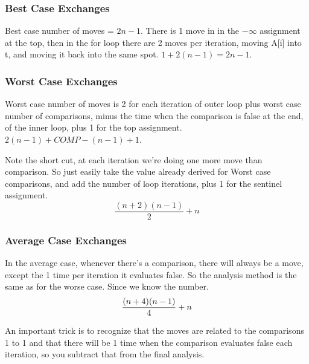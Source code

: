 \documentclass[english, 10pt]{article}
\begin{document}
\subsubsection{Best Case Exchanges}
Best case number of moves = $2n-1$. There is 1 move in in the $-\infty$ assignment at the top, then in the for loop there are 2 moves per iteration, moving A[i] into t,
and moving it back into the same spot. $1 + 2(n-1) = 2n -1$. \\

\subsubsection{Worst Case Exchanges}
Worst case number of moves is 2 for each iteration of outer loop plus worst case number of comparisons, minus the time when the comparison is false at the end, of the inner loop, plus 1 for the top assignment. $2(n-1) + COMP - (n-1) +1 $.

Note the short cut, at each iteration we're doing one more move than comparison. So just easily take the value already derived for Worst case comparisons,
and add the number of loop iterations, plus 1 for the sentinel assignment.
$$\frac{(n+2)(n-1)}{2} +n $$

\subsubsection{Average Case Exchanges}
In the average case, whenever there's a comparison, there will always be a move, except the 1 time per iteration it evaluates false.
So the analysis method is the same as for the worse case. Since we know the number.
$$\frac{(n+4) (n-1)}{4} + n$$
\begin{rem}
An important trick is to recognize that the moves are related to the comparisons 1 to 1 and that there will be 1 time when the comparison evaluates false each iteration, so you subtract that from the final analysis.
\end{rem}
\end{document}
